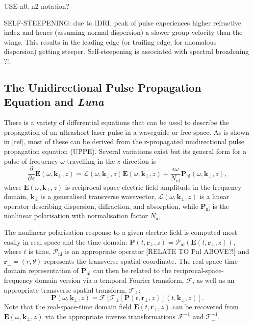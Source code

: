 \documentclass[a4paper]{jpconf}
\begin{document}
USE n0, n2 notation?


SELF-STEEPENING: due to IDRI, peak of pulse experiences higher refractive index and hence (assuming normal dispersion) a slower group velocity than the wings. This results in the leading edge (or trailing edge, for anomalous dispersion) getting steeper. Self-steepening is associated with spectral broadening ?!. 



\subsection{The Unidirectional Pulse Propagation Equation and \emph{Luna} }
There is a variety of differential equations that can be used to describe the propagation of an ultrashort laser pulse in a waveguide or free space. As is shown in [ref], most of these can be derived from the z-propagated unidirectional pulse propagation equation (UPPE). Several variations exist but its general form for a pulse of frequency $\omega$ travelling in the $z$-direction is 
\begin{equation}
\frac{\partial}{\partial z} \mathbf{E}(\omega, \mathbf{k}_\perp, z)= \mathcal{L}(\omega, \mathbf{k}_\perp, z)\mathbf{E}(\omega, \mathbf{k}_\perp, z) + \frac{i \omega}{N_{\text{nl}}} \mathbf{P}_\text{nl}(\omega, \mathbf{k}_\perp, z),
\end{equation}
where $\mathbf{E}(\omega, \mathbf{k}_\perp, z)$ is reciprocal-space electric field amplitude in the frequency domain, $\mathbf{k}_\perp$ is a generalised transverse wavevector,  $\mathcal{L}(\omega, \mathbf{k}_\perp, z)$ is a linear operator describing dispersion, diffraction, and absorption, while $\mathbf{P}_\text{nl}$ is the nonlinear polarisation with normalisation factor $N_\text{nl}$. \par 
The nonlinear polarisation response to a given electric field is computed most easily in real space and the time domain: $\mathbf{P}(t, \mathbf{r}_\perp,z) = \mathcal{P}_\text{nl}(\mathbf{E}(t,\mathbf{r}_\perp,z))$, where $t$ is time, $\mathcal{P}_\text{nl}$ is an appropriate operator [RELATE TO Pnl ABOVE?!] and $\mathbf{r}_\perp = (r, \theta)$ represents the transverse spatial coordinate. The real-space-time domain representation of $\mathbf{P}_\text{nl}$ can then be related to the reciprocal-space-frequency domain version via a temporal Fourier transform, $\mathcal{F}$, as well as an appropriate transverse spatial transform, $\mathcal{T}_\perp$:
\begin{equation}
\mathbf{P}(\omega, \mathbf{k}_\perp,z) = \mathcal{F}\left[ \mathcal{T}_\perp \left[ \mathbf{P}(t, \mathbf{r}_\perp,z) \right](t, \mathbf{k}_\perp, z)  \right]. 
\end{equation}
Note that the real-space-time domain field $\mathbf{E}(t, \mathbf{r}_\perp, z)$ can be recovered from $\mathbf{E}(\omega, \mathbf{k}_\perp, z)$ via the appropriate inverse transformations $\mathcal{F}^{-1}$ and $\mathcal{T}^{-1}_\perp$. \par 
\end{document}
